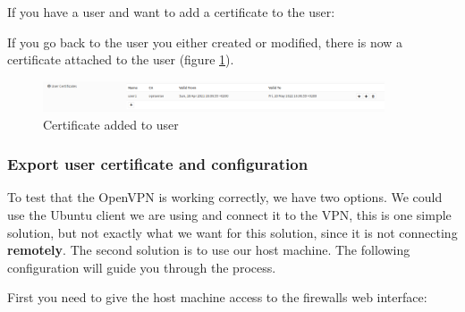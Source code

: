 If you have a user and want to add a certificate to the user:


If you go back to the user you either created or modified, there is now a certificate attached to the user (figure \ref{opnsense:vpn_cert_added}).

\begin{figure}[h!]
    \centering
    \includegraphics[width=0.9\textwidth]{Images/vpn/user_cert.PNG}
    \caption{Certificate added to user}
    \label{opnsense:vpn_cert_added}
\end{figure}

\subsubsection{Export user certificate and configuration}
To test that the OpenVPN is working correctly, we have two options. We could use the Ubuntu client we are using and connect it to the VPN, this is one simple solution, but not exactly what we want for this solution, since it is not connecting \textbf{remotely}. The second solution is to use our host machine. The following configuration will guide you through the process.

First you need to give the host machine access to the firewalls web interface:

